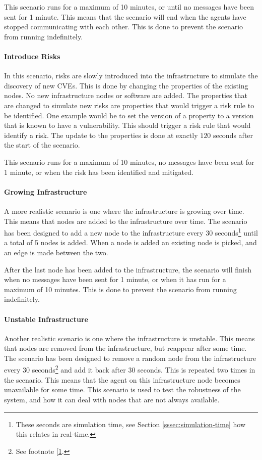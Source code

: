 This scenario runs for a maximum of 10 minutes, or until no messages have been sent for 1 minute. This means that the scenario will end when the agents have stopped communicating with each other. This is done to prevent the scenario from running indefinitely.

\paragraph{Introduce Risks} 
In this scenario, risks are slowly introduced into the infrastructure to simulate the discovery of new CVEs. This is done by changing the properties of the existing nodes. No new infrastructure nodes or software are added. The properties that are changed to simulate new risks are properties that would trigger a risk rule to be identified. One example would be to set the  version of a property to a version that is known to have a vulnerability. This should trigger a risk rule that would identify a risk.
The update to the properties is done at exactly $120$ seconds after the start of the scenario. 

This scenario runs for a maximum of 10 minutes, no messages have been sent for 1 minute, or when the risk has been identified and mitigated.

\paragraph*{Growing Infrastructure}
A more realistic scenario is one where the infrastructure is growing over time. This means that nodes are added to the infrastructure over time. The scenario has been designed to add a new node to the infrastructure every 30 seconds\footnote{\label{footnote:simulation-time}These seconds are simulation time, see Section \ref{sssec:simulation-time} how this relates in real-time.} until a total of 5 nodes is added. When a node is added an existing node is picked, and an edge is made between the two.

After the last node has been added to the infrastructure, the scenario will finish when no messages have been sent for 1 minute, or when it has run for a maximum of 10 minutes. This is done to prevent the scenario from running indefinitely.

\paragraph*{Unstable Infrastructure}
Another realistic scenario is one where the infrastructure is unstable. This means that nodes are removed from the infrastructure, but reappear after some time. The scenario has been designed to remove a random node from the infrastructure every 30 seconds\footnote{See footnote [\ref{footnote:simulation-time}.} and add it back after 30 seconds. This is repeated two times in the scenario. This means that the agent on this infrastructure node becomes unavailable for some time. This scenario is used to test the robustness of the system, and how it can deal with nodes that are not always available.

